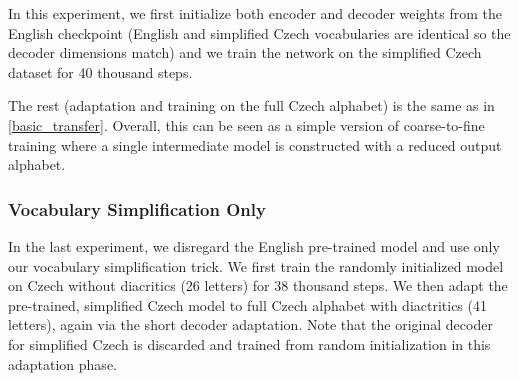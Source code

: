 In this experiment, we first initialize both encoder and decoder weights from the English checkpoint (English and simplified Czech vocabularies are identical so the decoder dimensions match) and we train the network on the simplified Czech dataset for 40 thousand steps.

The rest (adaptation and training on the full Czech alphabet)
is the same as in \cref{basic_transfer}.
%
Overall, this can be seen as a simple version of coarse-to-fine training where a single intermediate model is constructed with a reduced output alphabet.

\subsubsection{Vocabulary Simplification Only}
\label{sub_sec:simplification}





In the last experiment, we disregard the English pre-trained model and use only our vocabulary simplification trick. We first train the randomly initialized model on Czech without diacritics (26 letters) for 38 thousand steps. We then adapt the pre-trained, simplified Czech model to full Czech alphabet with diactritics (41 letters), again via the short decoder adaptation. Note that the original decoder for simplified Czech is discarded and trained from random initialization in this adaptation phase.



